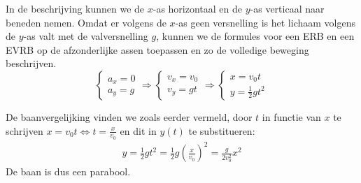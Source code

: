 \documentclass{ximera}
\begin{document}

In de beschrijving kunnen we de $x$-as horizontaal en de $y$-as verticaal naar beneden nemen. Omdat er volgens de $x$-as geen versnelling is het lichaam volgens de $y$-as valt met de valversnelling $g$, kunnen we de formules voor een ERB en een EVRB op de afzonderlijke assen toepassen en zo de volledige beweging beschrijven.
\begin{equation*}
	\left\{
	\begin{array}{l}
	a_x=0\\
	a_y=g
	\end{array}
	\right.
	\Rightarrow
	\left\{
	\begin{array}{l}
	v_x=v_0\\
	v_y=gt
	\end{array}
	\right.
	\Rightarrow
	\left\{
	\begin{array}{l}
	x=v_0t\\
	y=\frac{1}{2}gt^2
	\end{array}
	\right.
\end{equation*}


De baanvergelijking vinden we zoals eerder vermeld, door $t$ in functie van $x$ te schrijven $x=v_0t\Leftrightarrow t=\frac{x}{v_0}$ en dit in $y(t)$ te substitueren:
\begin{eqnarray*}
	y=\frac{1}{2}gt^2=\frac{1}{2}g\left(\frac{x}{v_0}\right)^2=\frac{g}{2v_0^2}x^2
\end{eqnarray*}
De baan is dus een parabool.
\end{document}
